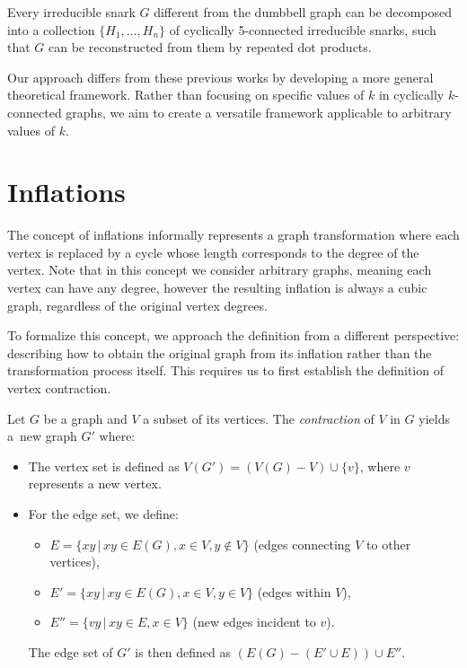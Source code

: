 \documentclass[12pt, twoside]{book}
\begin{document}
\begin{theorem}
	Every irreducible snark $G$ different from the dumbbell graph can be decomposed into a collection $\{H_1, \dots , H_n\}$ of cyclically 5-connected irreducible snarks, such that $G$ can be reconstructed from them by repeated dot products.
\end{theorem}

Our approach differs from these previous works by developing a more general theoretical framework. Rather than focusing on specific values of $k$ in cyclically \mbox{$k$-connected} graphs, we aim to create a versatile framework applicable to arbitrary values of $k$.

\section{Inflations}\label{sec:inflations}

The concept of inflations informally represents a graph transformation where each vertex is replaced by a cycle whose length corresponds to the degree of the vertex. Note that in this concept we consider arbitrary graphs, meaning each vertex can have any degree, however the resulting inflation is always a cubic graph, regardless of the original vertex degrees.

To formalize this concept, we approach the definition from a different perspective: describing how to obtain the original graph from its inflation rather than the transformation process itself. This requires us to first establish the definition of vertex contraction.

Let $G$ be a graph and $V$ a subset of its vertices. The \textit{contraction} of $V$ in $G$ yields a~new graph $G'$ where:
\begin{itemize}
	\item The vertex set is defined as $V(G') = (V(G)-V)\cup \{v\}$, where $v$ represents a new vertex.
	\item For the edge set, we define:
	\begin{itemize}
		\item $E=\{xy\,|\,xy\in E(G), x\in V, y\notin V\}$ (edges connecting $V$ to other vertices),
		\item $E'=\{xy\,|\,xy\in E(G), x\in V, y\in V\}$ (edges within $V$),
		\item $E''=\{vy\,|\, xy\in E, x\in V\}$ (new edges incident to $v$).
	\end{itemize}
	
	The edge set of $G'$ is then defined as ${\left(E(G)-\left(E'\cup E\right)\right)\cup E''}$.
\end{itemize}
\end{document}
